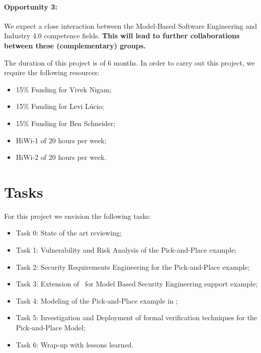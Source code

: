 \paragraph{Opportunity 3:} We expect a close interaction between the Model-Based Software Engineering and Industry 4.0 competence fields. \textbf{This will lead to further collaborations between these (complementary) groups.}

\bigskip


The duration of this project is of 6 months. In order to carry out this project, we require the following resources:

\begin{itemize}
  \item 15\% Funding for Vivek Nigam;
  \item 15\% Funding for Levi L\'ucio;
  \item 15\% Funding for Ben Schneider;
  \item HiWi-1 of 20 hours per week;
  \item HiWi-2 of 20 hours per week.
\end{itemize}

\section{Tasks}

For this project we envision the following tasks:

\begin{itemize}
  \item Task 0: State of the art reviewing;
  \item Task 1: Vulnerability and Risk Analysis of the Pick-and-Place example;  
  \item Task 2: Security Requirements Engineering for the Pick-and-Place
  example;
  \item Task 3: Extension of \autofocus\ for Model Based Security Engineering
  support example;
  \item Task 4: Modeling of the Pick-and-Place example in \autofocus;
  \item Task 5: Investigation and Deployment of formal verification techniques for the Pick-and-Place Model;
  \item Task 6: Wrap-up with lessons learned.
\end{itemize}

